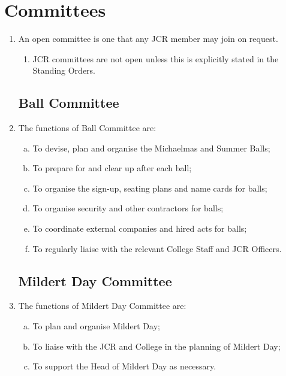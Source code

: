 \documentclass[12pt]{article}  %
\begin{document}
\section{Committees}
\begin{enumerate}
	\item An open committee is one that any JCR member may join on request.
	\begin{enumerate}
		\item JCR committees are not open unless this is explicitly stated in the Standing Orders.
	\end{enumerate}
	\subsection{Ball Committee}
	\item The functions of Ball Committee are:
	\begin{enumerate}[(a)]
		\item To devise, plan and organise the Michaelmas and Summer Balls;
		\item To prepare for and clear up after each ball;
		\item To organise the sign-up, seating plans and name cards for balls;
		\item To organise security and other contractors for balls;
		\item To coordinate external companies and hired acts for balls;
		\item To regularly liaise with the relevant College Staff and JCR Officers.
	\end{enumerate}
	\subsection{Mildert Day Committee}
	\item The functions of Mildert Day Committee are:
	\begin{enumerate}[(a)]
		\item To plan and organise Mildert Day;
		\item To liaise with the JCR and College in the planning of Mildert Day;
		\item To support the Head of Mildert Day as necessary.
	\end{enumerate}

\end{enumerate}
\end{document}

